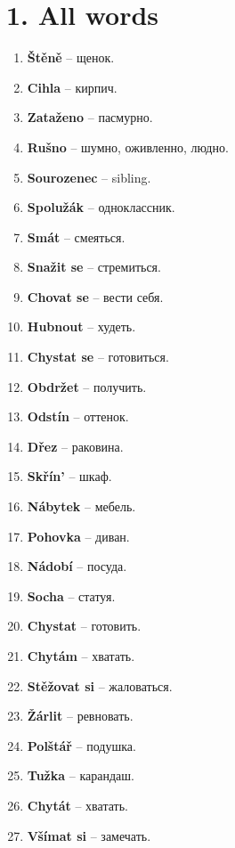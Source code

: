 \documentclass[12pt]{book}
\newcommand{\words}[2]{
    \renewcommand\chaptername{}
    \renewcommand\thechapter{}
    \chapter{#1. #2}
    \renewcommand\thechapter{#1}
}
\begin{document}
\words{1}{All words}
\begin{enumerate}
    \item \textbf{Štěně} -- \textrussian{щенок}.
    \item \textbf{Cihla} -- \textrussian{кирпич}.
    \item \textbf{Zataženo} -- \textrussian{пасмурно}.
    \item \textbf{Rušno} -- \textrussian{шумно, оживленно, людно}.
    \item \textbf{Sourozenec} -- \textrussian{sibling}.
    \item \textbf{Spolužák} -- \textrussian{одноклассник}.
    \item \textbf{Smát} -- \textrussian{смеяться}.
    \item \textbf{Snažit se} -- \textrussian{стремиться}.
    \item \textbf{Chovat se} -- \textrussian{вести себя}.
    \item \textbf{Hubnout} -- \textrussian{худеть}.
    \item \textbf{Chystat se} -- \textrussian{готовиться}.
    \item \textbf{Obdržet} -- \textrussian{получить}.
    \item \textbf{Odstín} -- \textrussian{оттенок}.
    \item \textbf{Dřez} -- \textrussian{раковина}.
    \item \textbf{Skřín'} -- \textrussian{шкаф}.
    \item \textbf{Nábytek} -- \textrussian{мебель}.
    \item \textbf{Pohovka} -- \textrussian{диван}.
    \item \textbf{Nádobí} -- \textrussian{посуда}.
    \item \textbf{Socha} -- \textrussian{статуя}.
    \item \textbf{Chystat} -- \textrussian{готовить}.
    \item \textbf{Chytám} -- \textrussian{хватать}.
    \item \textbf{Stěžovat si} -- \textrussian{жаловаться}.
    \item \textbf{Žárlit} -- \textrussian{ревновать}.
    \item \textbf{Polštář} -- \textrussian{подушка}.
    \item \textbf{Tužka} -- \textrussian{карандаш}.
    \item \textbf{Chytát} -- \textrussian{хватать}.
    \item \textbf{Všímat si} -- \textrussian{замечать}.

\end{enumerate}
\end{document}
